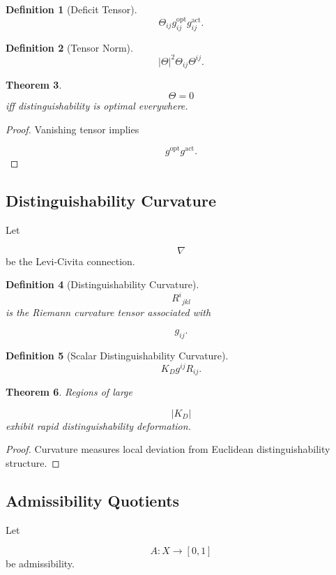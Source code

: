 \documentclass[12pt]{article}
\newtheorem{theorem}{Theorem}[section]
\newtheorem{definition}[theorem]{Definition}
\theoremstyle{remark}
\begin{document}
\begin{definition}[Deficit Tensor]
\[
\Theta_{ij}
g^{\mathrm{opt}}_{ij}

g^{\mathrm{act}}_{ij}.
\]
\end{definition}

\begin{definition}[Tensor Norm]
\[
|\Theta|^2
\Theta_{ij}\Theta^{ij}.
\]
\end{definition}

\begin{theorem}
\[
\Theta=0
\]
iff distinguishability is optimal everywhere.
\end{theorem}

\begin{proof}
Vanishing tensor implies

\[
g^{\mathrm{opt}}
g^{\mathrm{act}}.
\]
\end{proof}

\subsection{Distinguishability Curvature}

Let

\[
\nabla
\]
be the Levi-Civita connection.

\begin{definition}[Distinguishability Curvature]
\[
R^i{}_{jkl}
\]
is the Riemann curvature tensor associated with

\[
g_{ij}.
\]
\end{definition}
\begin{definition}[Scalar Distinguishability Curvature]
\[
K_D
g^{ij}R_{ij}.
\]
\end{definition}

\begin{theorem}
Regions of large

\[
|K_D|
\]
exhibit rapid distinguishability deformation.
\end{theorem}

\begin{proof}
Curvature measures local deviation from Euclidean distinguishability structure.
\end{proof}

\subsection{Admissibility Quotients}

Let

\[
A:X\rightarrow[0,1]
\]
be admissibility.
\end{document}
